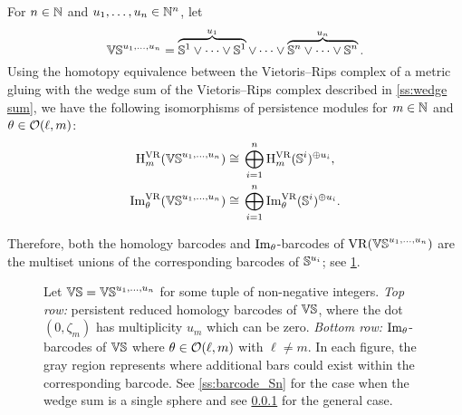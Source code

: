 \subsubsection{}\label{ss:barcodes_VS}

For $n \in \mathbb{N}$ and $u_1, \dots, u_n \in \mathbb{N}^n$, let
\[
\mathbb{VS}^{u_1,\dots,u_n} =
\overbrace{\mathbb{S}^1\vee\dots\vee\mathbb{S}^1}^{u_1} \vee\dots\vee \overbrace{\mathbb{S}^n\vee\dots\vee\mathbb{S}^n}^{u_n}.
\]
Using the homotopy equivalence between the Vietoris--Rips complex of a metric gluing with the wedge sum of the Vietoris--Rips complex described in \cref{ss:wedge sum}, we have the following isomorphisms of persistence modules for \(m \in \mathbb{N}\) and \(\theta \in \mathcal{O}(\ell,m)\):
\[
\begin{split}
	\mathrm{H}_m^{\mathrm{VR}}(\mathbb{VS}^{u_1,\dots,u_n}) &\cong \, \bigoplus_{i=1}^n \mathrm{H}_m^{\mathrm{VR}}(\mathbb{S}^i)^{\oplus u_i}, \\
	\operatorname{Im}_\theta^{\mathrm{VR}}(\mathbb{VS}^{u_1,\dots,u_n}) &\cong \, \bigoplus_{i=1}^n \operatorname{Im}_\theta^{\mathrm{VR}}(\mathbb{S}^i)^{\oplus u_i}.
\end{split}
\]

Therefore, both the homology barcodes and \(\operatorname{Im}_\theta\)-barcodes of \(\mathrm{VR}(\mathbb{VS}^{u_1, \dots, u_n})\) are the multiset unions of the corresponding barcodes of \(\mathbb{S}^{u_i}\); see \cref{fig:barcodes_vs}.

\begin{figure}
	\centering
	
	\caption{Let $\mathbb{VS} = \mathbb{VS}^{u_1,\dots,u_n}$ for some tuple of non-negative integers.
		\emph{Top row:} persistent reduced homology barcodes of $\mathbb{VS}$, where the dot $(0,\zeta_m)$ has multiplicity $u_m$ which can be zero.
		\emph{Bottom row:} $\operatorname{Im}_\theta$-barcodes of $\mathbb{VS}$ where $\theta \in \mathcal{O}(\ell,m)$ with \(\ell \neq m\).
        In each figure, the gray region represents where additional bars could exist within the corresponding barcode.
        See \cref{ss:barcode_Sn} for the case when the wedge sum is a single sphere and see \cref{ss:barcodes_VS} for the general case.}
	\label{fig:barcodes_vs}
\end{figure}